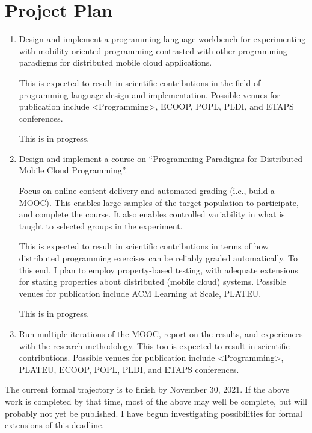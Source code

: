 \section{Project Plan}

\begin{enumerate}

\item Design and implement a programming language workbench for
experimenting with mobility-oriented programming contrasted with other
programming paradigms for distributed mobile cloud applications.

This is expected to result in scientific contributions in the field of
programming language design and implementation. Possible venues for
publication include <Programming>, ECOOP, POPL, PLDI, and ETAPS conferences.

This is in progress.

\item Design and implement a course on ``Programming Paradigms for
Distributed Mobile Cloud Programming''.

Focus on online content delivery and automated grading (i.e., build a
MOOC). This enables large samples of the target population to
participate, and complete the course. It also enables controlled
variability in what is taught to selected groups in the experiment.

This is expected to result in scientific contributions in terms of how
distributed programming exercises can be reliably graded
automatically. To this end, I plan to employ property-based
testing\cite{2000-QuickCheck, 2006-Telecoms-QuickCheck}, with adequate
extensions for stating properties about distributed (mobile cloud)
systems. Possible venues for publication include ACM Learning at
Scale, PLATEU.

This is in progress.

\item Run multiple iterations of the MOOC, report on the results, and
experiences with the research methodology. This too is expected to
result in scientific contributions. Possible venues for publication
include <Programming>, PLATEU, ECOOP, POPL, PLDI, and ETAPS
conferences.

\end{enumerate}

The current formal trajectory is to finish by November 30, 2021. If
the above work is completed by that time, most of the above may well
be complete, but will probably not yet be published. I have begun
investigating possibilities for formal extensions of this deadline.

